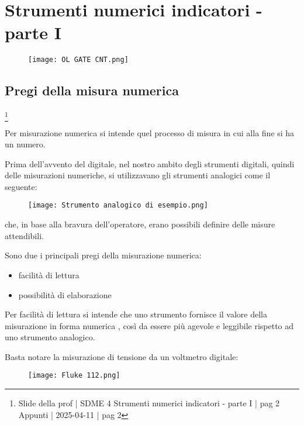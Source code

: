 \chapter{Strumenti numerici indicatori - parte I}

\begin{figure}[h]
    \centering
    \texttt{[image: OL GATE CNT.png]}
\end{figure}

\newpage 

\section{Pregi della misura numerica}
\footnote{Slide della prof | SDME 4 Strumenti numerici indicatori - parte I | pag 2 \\  
Appunti | 2025-04-11 | pag 2}

Per misurazione numerica si intende quel processo di misura in cui alla fine si ha un numero. \newline 

Prima dell'avvento del digitale, nel nostro ambito degli strumenti digitali, quindi delle misurazioni numeriche, 
si utilizzavano gli strumenti analogici come il seguente: 

\begin{figure}[h]
    \centering
    \texttt{[image: Strumento analogico di esempio.png]}
\end{figure}

che, in base alla bravura dell'operatore, erano possibili definire delle misure attendibili. \newline 

Sono due i principali pregi della misurazione numerica: 

\begin{itemize}
    \item facilità di lettura 
    \item possibilità di elaborazione
\end{itemize}

Per facilità di lettura si intende che uno strumento fornisce il valore della misurazione in forma
numerica , così da essere più agevole e leggibile rispetto ad uno strumento analogico. \newline 

Basta notare la misurazione di tensione da un voltmetro digitale: 

\begin{figure}[h]
    \centering
    \texttt{[image: Fluke 112.png]}
\end{figure}

